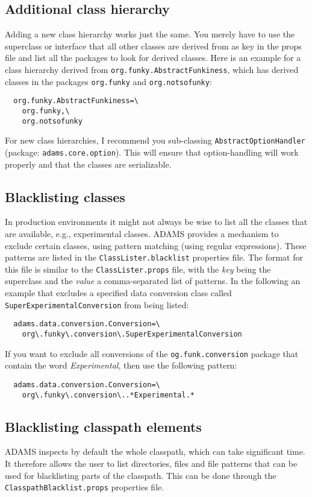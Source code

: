 \subsection{Additional class hierarchy}
Adding a new class hierarchy works just the same. You merely have to use the
superclass or interface that all other classes are derived from as key in the props file and
list all the packages to look for derived classes. Here is an example for a
class hierarchy derived from \texttt{org.funky.AbstractFunkiness}, which has
derived classes in the packages \texttt{org.funky} and \texttt{org.notsofunky}:
\begin{verbatim}
  org.funky.AbstractFunkiness=\
    org.funky,\
    org.notsofunky
\end{verbatim}
For new class hierarchies, I recommend you sub-classing \texttt{AbstractOptionHandler}
(package: \texttt{adams.core.option}). This will ensure that option-handling
will work properly and that the classes are serializable.

\subsection{Blacklisting classes}
In production environments it might not always be wise to list all the classes
that are available, e.g., experimental classes. ADAMS provides a mechanism to
exclude certain classes, using pattern matching (using regular expressions).
These patterns are listed in the \texttt{ClassLister.blacklist} properties file.
The format for this file is similar to the \texttt{ClassLister.props} file, with
the \textit{key} being the superclass and the \textit{value} a comma-separated
list of patterns. In the following an example that excludes a specified data
conversion class called \texttt{SuperExperimentalConversion} from being listed:
\begin{verbatim}
  adams.data.conversion.Conversion=\
    org\.funky\.conversion\.SuperExperimentalConversion
\end{verbatim}
If you want to exclude all conversions of the \texttt{og.funk.conversion}
package that contain the word \textit{Experimental}, then use the following
pattern:
\begin{verbatim}
  adams.data.conversion.Conversion=\
    org\.funky\.conversion\..*Experimental.*
\end{verbatim}

\subsection{Blacklisting classpath elements}
ADAMS inspects by default the whole classpath, which can take significant time.
It therefore allows the user to list directories, files and file patterns that
can be used for blacklisting parts of the classpath. This can be done through
the \texttt{ClasspathBlacklist.props} properties file.

